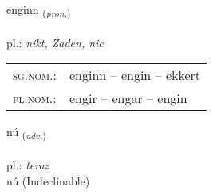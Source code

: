 \documentclass[frontgrid, backgrid]{flacards}\usepackage[]{graphicx}\usepackage[]{xcolor}
\begin{document}
\renewcommand{\flhead}{\vskip5pt \fboxsep=0pt {\small\bfseries\footnotesize Fornafn | Pronoun}}
\renewcommand{\fcfoot}{\vskip5pt \fboxsep=0pt \hspace{2pt}{\small\bfseries\footnotesize 1K}}

\renewcommand{\blhead}{\vskip5pt {\small\bfseries\footnotesize Fornafn | Pronoun }}
\renewcommand{\bcfoot}{\vskip5pt \hspace{2pt}{\small\bfseries\footnotesize 1K}}


{enginn \small{\textsubscript{(\textit{pron.})}} \\[1ex] %
\textphonetic{[eiɲcɪn]} \\
pl.: \emph{nikt, Żaden, nic} \\  [2ex]
\renewcommand*{\arraystretch}{0.8}
\begin{tabular}{ll}
\textsc{sg.nom.}: & enginn  --  engin -- ekkert \\ 
\textsc{pl.nom.}: & engir -- engar -- engin
\end{tabular}
}


\renewcommand{\flhead}{\vskip5pt \fboxsep=0pt {\small\bfseries\footnotesize Atviksorð | Adverb}}
\renewcommand{\fcfoot}{\vskip5pt \fboxsep=0pt \hspace{2pt}{\small\bfseries\footnotesize 1K}}

\renewcommand{\blhead}{\vskip5pt {\small\bfseries\footnotesize Atviksorð | Adverb }}
\renewcommand{\bcfoot}{\vskip5pt \hspace{2pt}{\small\bfseries\footnotesize 1K}}


{nú \small{\textsubscript{(\textit{adv.})}} \\[1ex]
\textphonetic{[nuː]} \\
pl.: \emph{teraz} \\  [2ex]
nú (Indeclinable)}

\renewcommand{\flhead}{\vskip5pt \fboxsep=0pt {\small\bfseries\footnotesize Sagnorð | Verb}}
\renewcommand{\fcfoot}{\vskip5pt \fboxsep=0pt \hspace{2pt}{\small\bfseries\footnotesize 1K}}
\end{document}

